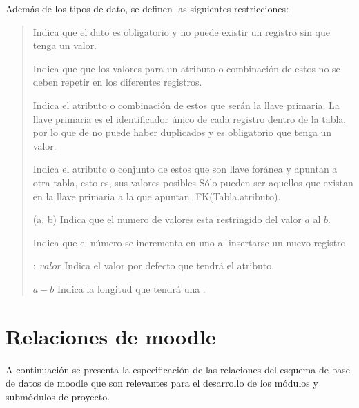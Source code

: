  Además de los tipos de dato, se definen las
 siguientes restricciones:

    \begin{quote}
    \begin{bGlosario}

            Indica que el dato es obligatorio y no puede existir un registro sin que tenga
            un valor.

            Indica que que los valores para un atributo o combinación de estos no se deben
            repetir en los diferentes registros.

            Indica el atributo o combinación de estos que serán la llave primaria. La llave
            primaria es el identificador único de cada registro dentro de la tabla, por lo
            que de no puede haber duplicados y es obligatorio que tenga un valor.

            Indica el atributo o conjunto de estos que son llave foránea y apuntan a otra
            tabla, esto es, sus valores posibles Sólo pueden ser aquellos que existan en la
            llave primaria a la que apuntan. FK(Tabla.atributo).

        (a, b)
            Indica que el numero de valores esta restringido del valor $a$ al $b$.

            Indica que el número se incrementa en uno al insertarse un nuevo registro.

         $:\ valor$
            Indica el valor por defecto que tendrá el atributo.

         $a-b$
            Indica la longitud que tendrá una .
    \end{bGlosario}
    \end{quote}

\clearpage

\section{Relaciones de moodle}

 A continuación se presenta la especificación de las relaciones del esquema de base
 de datos de moodle que son relevantes para el desarrollo de los módulos y submódulos
 de proyecto.


